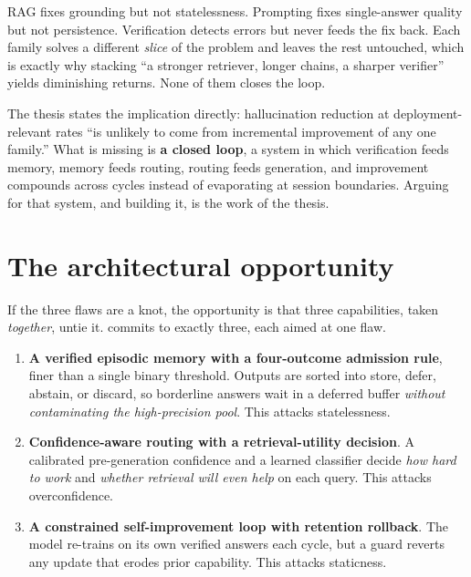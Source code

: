 \begin{intuition}
RAG fixes grounding but not statelessness. Prompting fixes single-answer quality
but not persistence. Verification detects errors but never feeds the fix back.
Each family solves a different \emph{slice} of the problem and leaves the rest
untouched, which is exactly why stacking ``a stronger retriever, longer chains,
a sharper verifier'' yields diminishing returns. None of them closes the loop.
\end{intuition}

The thesis states the implication directly: hallucination reduction at
deployment-relevant rates ``is unlikely to come from incremental improvement of
any one family.'' What is missing is \textbf{a closed loop}, a system in which
verification feeds memory, memory feeds routing, routing feeds generation, and
improvement compounds across cycles instead of evaporating at session
boundaries. Arguing for that system, and building it, is the work of the thesis.

\section{The architectural opportunity}
\label{sec:arch-opportunity}

If the three flaws are a knot, the opportunity is that three capabilities, taken
\emph{together}, untie it. \caem{} commits to exactly three, each aimed at one
flaw.

\begin{enumerate}[leftmargin=1.6em]
  \item \textbf{A verified episodic memory with a four-outcome admission rule},
  finer than a single binary threshold. Outputs are sorted into store, defer,
  abstain, or discard, so borderline answers wait in a deferred buffer
  \emph{without contaminating the high-precision pool}. This attacks
  statelessness.
  \item \textbf{Confidence-aware routing with a retrieval-utility decision}. A
  calibrated pre-generation confidence and a learned classifier decide
  \emph{how hard to work} and \emph{whether retrieval will even help} on each
  query. This attacks overconfidence.
  \item \textbf{A constrained self-improvement loop with retention rollback}.
  The model re-trains on its own verified answers each cycle, but a guard
  reverts any update that erodes prior capability. This attacks staticness.
\end{enumerate}

